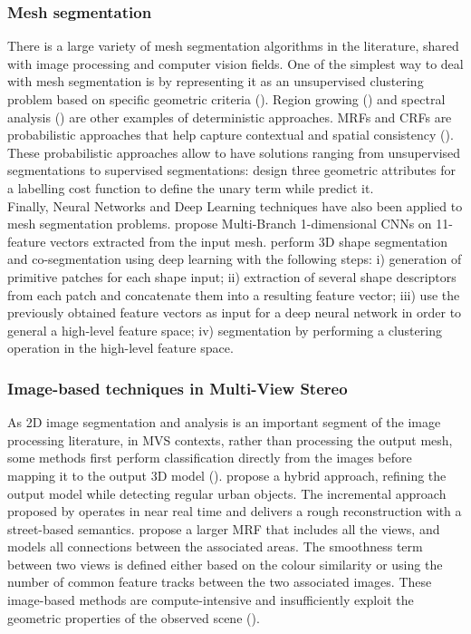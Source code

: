 \documentclass{kththesis}
\begin{document}
\subsubsection{Mesh segmentation}
There is a large variety of mesh segmentation algorithms in the literature, shared with image processing and computer vision fields.  One of the simplest way to deal with mesh segmentation is by representing it as an unsupervised
clustering problem based on specific geometric criteria (\textcite{Shlafman2002MetamorphosisOP}). Region growing (\textcite{PageRegionGrowing}) and spectral analysis (\textcite{ZhangSpectral}) are other examples of deterministic approaches. 
MRFs and CRFs are probabilistic approaches that help capture contextual and spatial consistency (\textcite{lafarge:hal-00759261}). These probabilistic approaches allow to have solutions  ranging from unsupervised segmentations to supervised segmentations: \textcite{verdie}  design three geometric attributes for a labelling cost function to define the unary term while  \textcite{rouhani} predict it. \\ 
Finally, Neural Networks and Deep Learning techniques have also been applied to mesh segmentation problems. \textcite{George2018} propose  Multi-Branch 1-dimensional CNNs on  11-feature vectors extracted from the input mesh. \textcite{Shu2016} perform 3D shape segmentation and co-segmentation using deep learning with the following steps: i) generation of primitive patches for each shape input; ii) extraction of  several shape descriptors from each patch and concatenate them into a resulting feature vector; iii) use the previously obtained feature vectors as input for a deep neural network in order to general a high-level feature space; iv) segmentation by performing a clustering operation in the high-level feature space.  


\subsubsection{Image-based techniques in Multi-View Stereo }
As 2D image segmentation and analysis is an important segment of the image processing literature, in MVS contexts, rather than processing the output mesh,  some methods first perform classification directly from
the images before mapping it to the output 3D model (\textcite{He2013}).  \textcite{lafarge:hal-00759261} propose a hybrid approach, refining the output model while detecting regular urban objects.    The
incremental approach proposed by \textcite{Vineet2015} operates in near real
time and delivers a rough reconstruction with a street-based semantics. \textcite{Xiao2009} propose a larger MRF that includes all the views, and
models all connections between the associated areas. The smoothness term
between two views is defined either based on the colour similarity or using
the number of common feature tracks between the two associated images.
These image-based methods are compute-intensive and insufficiently exploit
the geometric properties of the observed scene (\textcite{rouhani}).
\end{document}
